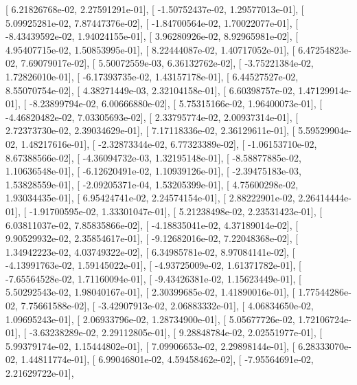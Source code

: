 \documentclass{article}
\begin{document}
       [  6.21826768e-02,   2.27591291e-01],
       [ -1.50752437e-02,   1.29577013e-01],
       [  5.09925281e-02,   7.87447376e-02],
       [ -1.84700564e-02,   1.70022077e-01],
       [ -8.43439592e-02,   1.94024155e-01],
       [  3.96280926e-02,   8.92965981e-02],
       [  4.95407715e-02,   1.50853995e-01],
       [  8.22444087e-02,   1.40717052e-01],
       [  6.47254823e-02,   7.69079017e-02],
       [  5.50072559e-03,   6.36132762e-02],
       [ -3.75221384e-02,   1.72826010e-01],
       [ -6.17393735e-02,   1.43157178e-01],
       [  6.44527527e-02,   8.55070754e-02],
       [  4.38271449e-03,   2.32104158e-01],
       [  6.60398757e-02,   1.47129914e-01],
       [ -8.23899794e-02,   6.00666880e-02],
       [  5.75315166e-02,   1.96400073e-01],
       [ -4.46820482e-02,   7.03305693e-02],
       [  2.33795774e-02,   2.00937314e-01],
       [  2.72373730e-02,   2.39034629e-01],
       [  7.17118336e-02,   2.36129611e-01],
       [  5.59529904e-02,   1.48217616e-01],
       [ -2.32873344e-02,   6.77323389e-02],
       [ -1.06153710e-02,   8.67388566e-02],
       [ -4.36094732e-03,   1.32195148e-01],
       [ -8.58877885e-02,   1.10636548e-01],
       [ -6.12620491e-02,   1.10939126e-01],
       [ -2.39475183e-03,   1.53828559e-01],
       [ -2.09205371e-04,   1.53205399e-01],
       [  4.75600298e-02,   1.93034435e-01],
       [  6.95424741e-02,   2.24574154e-01],
       [  2.88222901e-02,   2.26414444e-01],
       [ -1.91700595e-02,   1.33301047e-01],
       [  5.21238498e-02,   2.23531423e-01],
       [  6.03811037e-02,   7.85835866e-02],
       [ -4.18835041e-02,   4.37189014e-02],
       [  9.90529932e-02,   2.35854617e-01],
       [ -9.12682016e-02,   7.22048368e-02],
       [  1.34942223e-02,   4.03749322e-02],
       [  6.34985781e-02,   8.97084141e-02],
       [ -4.13991763e-02,   1.59145022e-01],
       [ -4.93725009e-02,   1.61371782e-01],
       [ -7.65564528e-02,   1.71160094e-01],
       [ -9.43426381e-02,   1.15623449e-01],
       [  5.50292543e-02,   1.98040167e-01],
       [  2.30399685e-02,   1.41890016e-01],
       [  1.77544286e-02,   7.75661588e-02],
       [ -3.42907913e-02,   2.06883332e-01],
       [  4.06834650e-02,   1.09695243e-01],
       [  2.06933796e-02,   1.28734900e-01],
       [  5.05677726e-02,   1.72106724e-01],
       [ -3.63238289e-02,   2.29112805e-01],
       [  9.28848784e-02,   2.02551977e-01],
       [  5.99379174e-02,   1.15444802e-01],
       [  7.09906653e-02,   2.29898144e-01],
       [  6.28333070e-02,   1.44811774e-01],
       [  6.99046801e-02,   4.59458462e-02],
       [ -7.95564691e-02,   2.21629722e-01],
\end{document}
